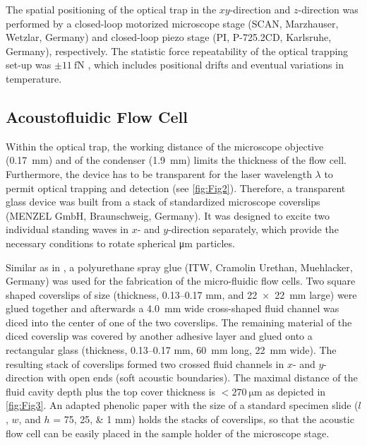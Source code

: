The spatial positioning of the optical trap in the $xy$-direction and 
$z$-direction was performed by a closed-loop motorized microscope stage (SCAN, 
Marzhauser, Wetzlar, Germany) and closed-loop piezo stage (PI, P-725.2CD, 
Karlsruhe, Germany), respectively. The statistic force repeatability of the 
optical trapping set-up was $\pm \SI{11}{\femto\newton}$ \cite{Lamprecht2016}, 
which includes positional drifts and eventual variations in temperature.

\subsection{Acoustofluidic Flow Cell\label{sec:VT-DeviceAndAcoustics}}

Within the optical trap, the working distance of the microscope objective 
(\SI{0.17}{\milli\meter}) and of the condenser (\SI{1.9}{\milli\meter}) limits 
the thickness of the flow cell.  Furthermore, the device has to be transparent 
for the laser wavelength $\lambda$ to permit optical trapping and detection (see 
\cref{fig:Fig2}). Therefore, a transparent glass device was built from a stack 
of standardized microscope coverslips (MENZEL GmbH, Braunschweig, Germany). It 
was designed to excite two individual standing waves in $x$- and $y$-direction 
separately, which provide the necessary conditions to rotate spherical 
\si{\micro\meter} particles. 

Similar as in \citeauthor{Lakamper} \cite{Lakamper}, a polyurethane spray glue 
(ITW, Cramolin Urethan, Muehlacker, Germany) was used for the fabrication of the 
micro-fluidic flow cells. Two square shaped coverslips of size (thickness, 
\numrange{0.13}{0.17} \si{\milli\meter}, and \SI{22x22}{\mm} large) were glued 
together and afterwards a \SI{4.0}{\milli\meter} wide cross-shaped fluid channel 
was diced into the center of one of the two coverslips. The remaining material 
of the diced coverslip was covered by another adhesive layer and glued onto a 
rectangular glass (thickness, \numrange{0.13}{0.17} \si{\milli\meter}, 
\SI{60}{\mm} long, \SI{22}{\mm} wide). The resulting stack of coverslips formed 
two crossed fluid channels in $x$- and $y$-direction with open ends (soft 
acoustic boundaries). The maximal distance of the fluid cavity depth plus the 
top cover thickness is $< \SI{270}{\micro\meter}$ as depicted in 
\cref{fig:Fig3}. An adapted phenolic paper with the size of a standard specimen 
slide ($l$, $w$, and $h$ = \numlist{75; 25; 1} \si{\mm}) holds the stacks of 
coverslips, so that the acoustic flow cell can be easily placed in the sample 
holder of the microscope stage.

